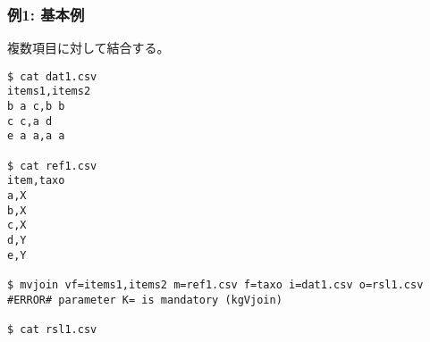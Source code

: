 
\subsubsection*{例1: 基本例}

複数項目に対して結合する。

\begin{Verbatim}[baselinestretch=0.7,frame=single]
$ cat dat1.csv
items1,items2
b a c,b b
c c,a d
e a a,a a

$ cat ref1.csv
item,taxo
a,X
b,X
c,X
d,Y
e,Y

$ mvjoin vf=items1,items2 m=ref1.csv f=taxo i=dat1.csv o=rsl1.csv
#ERROR# parameter K= is mandatory (kgVjoin)

$ cat rsl1.csv
\end{Verbatim}
